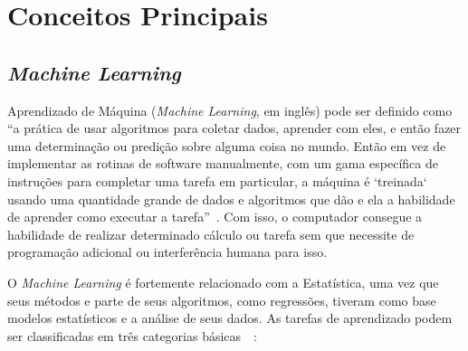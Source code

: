 \documentclass{article}
\begin{document}
\section{Conceitos Principais}

\subsection{\textit{Machine Learning}}
Aprendizado de Máquina (\textit{Machine Learning}, em inglês) pode ser definido como “a prática de usar algoritmos para coletar dados, aprender com eles, e então fazer uma determinação ou predição sobre alguma coisa no mundo. Então em vez de implementar as rotinas de software manualmente, com um gama específica de instruções para completar uma tarefa em particular, a máquina é `treinada` usando uma quantidade grande de dados e algoritmos que dão e ela a habilidade de aprender como executar a tarefa”~\citep{Copeland_2016}. Com isso, o computador consegue a habilidade de realizar determinado cálculo ou tarefa sem que necessite de programação adicional ou interferência humana para isso.

O \textit{Machine Learning} é fortemente relacionado com a Estatística, uma vez que seus métodos e parte de seus algoritmos, como regressões, tiveram como base modelos estatísticos e a análise de seus dados. As tarefas de aprendizado podem ser classificadas em três categorias básicas~\citep{MLWikipedia_2021}~\citep{MLSAS_2021}:
\end{document}
